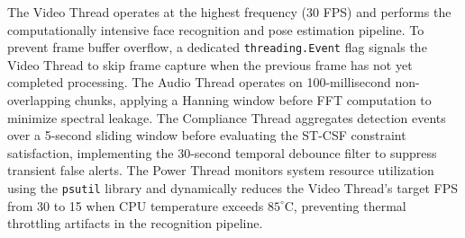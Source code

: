\documentclass[12pt,a4paper,oneside]{report}
\begin{document}
The Video Thread operates at the highest frequency (30 FPS) and performs the computationally intensive face recognition and pose estimation pipeline. To prevent frame buffer overflow, a dedicated \texttt{threading.Event} flag signals the Video Thread to skip frame capture when the previous frame has not yet completed processing. The Audio Thread operates on 100-millisecond non-overlapping chunks, applying a Hanning window before FFT computation to minimize spectral leakage. The Compliance Thread aggregates detection events over a 5-second sliding window before evaluating the ST-CSF constraint satisfaction, implementing the 30-second temporal debounce filter to suppress transient false alerts. The Power Thread monitors system resource utilization using the \texttt{psutil} library and dynamically reduces the Video Thread's target FPS from 30 to 15 when CPU temperature exceeds $85^{\circ}$C, preventing thermal throttling artifacts in the recognition pipeline.
\end{document}
